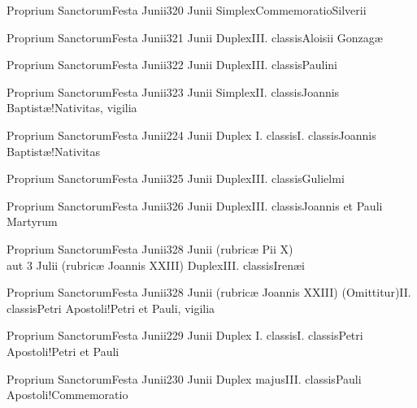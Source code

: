 \documentclass[psalterium-feriale.tex]{subfiles}
\begin{document}
	{Proprium Sanctorum}{Festa Junii}{3}{20 Junii}
	{Simplex}{Commemoratio}{Silverii}
	{}
	{}
\UMEXaRubric

	{Proprium Sanctorum}{Festa Junii}{3}{21 Junii}
	{Duplex}{III. classis}{Aloisii Gonzagæ}
	{}
	{}
\COPObRubric

	{Proprium Sanctorum}{Festa Junii}{3}{22 Junii}
	{Duplex}{III. classis}{Paulini}
	{}
	{}
\COPObRubric

	{Proprium Sanctorum}{Festa Junii}{3}{23 Junii}
	{Simplex}{II. classis}{Joannis Baptistæ!Nativitas, vigilia}
	{}
	{}
\feriaRubric

	{Proprium Sanctorum}{Festa Junii}{2}{24 Junii}
	{Duplex I. classis}{I. classis}{Joannis Baptistæ!Nativitas}
	{}
	{}
\psalmodiapropria


	{Proprium Sanctorum}{Festa Junii}{3}{25 Junii}
	{Duplex}{III. classis}{Gulielmi}
	{}
	{}
\COPObRubric

	{Proprium Sanctorum}{Festa Junii}{3}{26 Junii}
	{Duplex}{III. classis}{Joannis et Pauli Martyrum}
	{}
	{}
\PMEXbRubric

	{Proprium Sanctorum}{Festa Junii}{3}{28 Junii (rubricæ Pii X)\\aut 3 Julii (rubricæ Joannis XXIII)}
	{Duplex}{III. classis}{Irenæi}
	{}
	{}
\UMEXcRubric

	{Proprium Sanctorum}{Festa Junii}{3}{28 Junii (rubricæ Joannis XXIII)}
	{(Omittitur)}{II. classis}{Petri Apostoli!Petri et Pauli, vigilia}
	{}
	{}
\feriaRubric

	{Proprium Sanctorum}{Festa Junii}{2}{29 Junii}
	{Duplex I. classis}{I. classis}{Petri Apostoli!Petri et Pauli}
	{}
	{}
\psalmodiapropria


	{Proprium Sanctorum}{Festa Junii}{2}{30 Junii}
	{Duplex majus}{III. classis}{Pauli Apostoli!Commemoratio}
	{}
	{}
\psalmodiapropria
\end{document}
